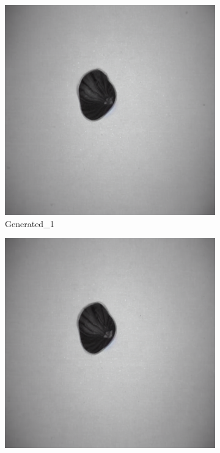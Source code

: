 \documentclass[12pt,DIV14,BCOR12mm,a4paper,footinclude=false,headinclude,parskip=half-,twoside,openright,cleardoublepage=empty,toc=index,bibliography=totoc,listof=totoc]{scrreprt}
\numberwithin{equation}{chapter}
\begin{document}
\begin{figure}
    \begin{minipage}[H]{\linewidth}
        \centering
        \begin{minipage}[H]{0.5\linewidth} %
            \centering
            \begin{subfigure}[t]{0.48\linewidth}
                \centering
                \includegraphics[width=\linewidth]{../media/nut_generated_1_1.png}
                \caption{Generated\_1}
            \end{subfigure}%
            \hfill
            \begin{subfigure}[t]{0.48\linewidth}
                \centering
                \includegraphics[width=\linewidth]{../media/nut_generated_1_2.png}

\end{subfigure}
\end{minipage}
\end{minipage}
\end{figure}
\end{document}

